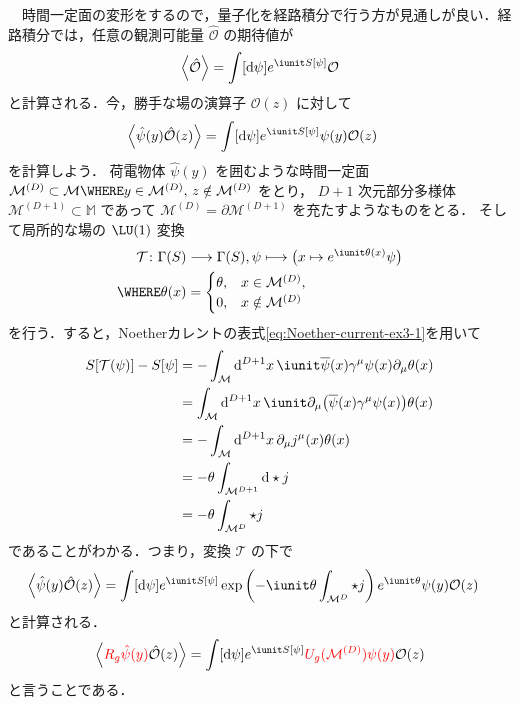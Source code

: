 \documentclass[TQFT_main]{subfiles}
\begin{document}
　時間一定面の変形をするので，量子化を経路積分で行う方が見通しが良い．経路積分では，任意の観測可能量 $\hat{\mathcal{O}}$ の期待値が
\begin{align}
    \ev{\hat{\mathcal{O}}} = \int [\dd{\psi}] e^{\iunit S[\psi]} \mathcal{O}
\end{align}
と計算される．今，勝手な場の演算子 $\mathcal{O}(z)$ に対して
\begin{align}
    \ev{\hat{\psi}(y) \hat{\mathcal{O}}(z)}
    &= \int [\dd{\psi}] e^{\iunit S[\psi]} \psi(y) \mathcal{O}(z)
\end{align}
を計算しよう．
荷電物体 $\hat{\psi}(y)$ を囲むような時間一定面 $\mathcal{M}^{(D)} \subset \mathcal{M} \WHERE y \in \mathcal{M}^{(D)},\, z \notin \mathcal{M}^{(D)}$ をとり，
$D+1$ 次元部分多様体 $\mathcal{M}^{(D+1)} \subset \mathbb{M}$ であって $\mathcal{M}^{(D)} = \partial \mathcal{M}^{(D+1)}$ を充たすようなものをとる．
そして局所的な場の $\LU (1)$ 変換
\begin{align}
    \mathcal{T} \colon \Gamma(S) &\lto \Gamma(S), \psi \lmto \bigl( x \mapsto e^{\iunit \theta(x)} \psi \bigr)  \\
    \WHERE \theta(x) &= 
    \begin{cases}
        \theta, & x \in \mathcal{M}^{(D)}, \\
        0, & x \notin \mathcal{M}^{(D)}
    \end{cases}
\end{align}
を行う．すると，Noetherカレントの表式\eqref{eq:Noether-current-ex3-1}を用いて
\begin{align}
    S[\mathcal{T}(\psi)] - S[\psi]
    &= - \int_{\mathcal{M}} \dd[D+1]{x} \iunit \overline{\psi}(x) \gamma^\mu \psi(x) \partial_\mu \theta(x) \\
    &= \int_{\mathcal{M}} \dd[D+1]{x} \iunit \partial_\mu\bigl(\overline{\psi}(x) \gamma^\mu \psi(x)\bigr) \theta(x) \\
    &= -\int_{\mathcal{M}} \dd[D+1]{x} \partial_\mu j^\mu(x)  \theta(x) \\
    &= -\theta \int_{\mathcal{M}^{D+1}} \dd \star j \\
    &= -\theta \int_{\mathcal{M}^{D}} \star j 
\end{align}
であることがわかる．つまり，変換 $\mathcal{T}$ の下で
\begin{align}
    \ev{\hat{\psi}(y)\hat{\mathcal{O}}(z)}
    &= \int [\dd{\psi}] e^{\iunit S[\psi]} \exp\left(-\iunit \theta \int_{\mathcal{M}^{D}} \star j\right) e^{\iunit \theta}\psi(y) \mathcal{O}(z)
\end{align}
と計算される．
\begin{align}
    \label{eq:0-form-topo-ops}
    \ev{\textcolor{red}{R_g \hat{\psi}(y)}\hat{\mathcal{O}}(z)} = \int [\dd{\psi}] e^{\iunit S[\psi]} \textcolor{red}{U_g (\mathcal{M}^{(D)}) \psi(y)} \mathcal{O}(z)
\end{align}
と言うことである．
\end{document}
